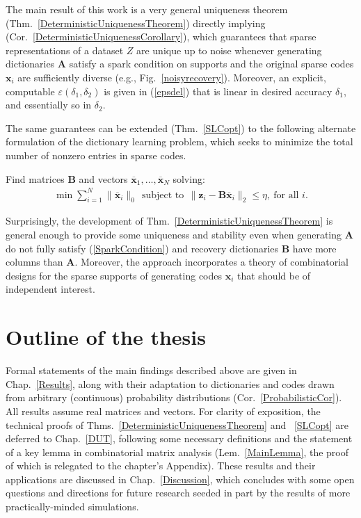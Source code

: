 The main result of this work is a very general uniqueness theorem (Thm.~\ref{DeterministicUniquenessTheorem}) directly 
implying (Cor.~\ref{DeterministicUniquenessCorollary}), which guarantees that sparse representations of a dataset $Z$ are unique up to noise whenever generating dictionaries $\mathbf{A}$ satisfy a spark condition on supports and the original sparse codes $\mathbf{x}_i$ are sufficiently diverse (e.g., Fig.~\ref{noisyrecovery}).  Moreover, an explicit, computable $\varepsilon(\delta_1, \delta_2)$ is given in (\ref{epsdel}) that is linear in desired accuracy $\delta_1$, and essentially so in $\delta_2$.

The same guarantees can be extended (Thm.~\ref{SLCopt}) to the following alternate formulation of the dictionary learning problem, which seeks to minimize the total number of nonzero entries in sparse codes.

\begin{problem}\label{OptimizationProblem}
Find matrices $\mathbf{B}$ and vectors \mbox{$\mathbf{\overline x}_1, \ldots, \mathbf{\overline x}_N$} solving:
\begin{align}\label{minsum}
\min \sum_{i = 1}^N \|\mathbf{\overline x}_{i}\|_0 \ \
\text{subject to} \ \ \|\mathbf{z}_i - \mathbf{B}\mathbf{\overline x}_i\|_2 \leq \eta, \ \text{for all $i$}.
\end{align}
\end{problem}

Surprisingly, the development of Thm.~\ref{DeterministicUniquenessTheorem} is general enough to provide some uniqueness and stability even when generating $\mathbf{A}$ do not fully satisfy (\ref{SparkCondition}) and recovery dictionaries $\mathbf{B}$ have more columns than $\mathbf{A}$.  Moreover, the approach incorporates a theory of combinatorial designs for the sparse supports of generating codes $\mathbf{x}_i$ that should be of independent interest. 

\section{Outline of the thesis}

Formal statements of the main findings described above are given in Chap.~\ref{Results}, along with their adaptation to dictionaries and codes drawn from arbitrary (continuous) probability distributions (Cor.~\ref{ProbabilisticCor}). All results assume real matrices and vectors. For clarity of exposition, the technical proofs of Thms.~\ref{DeterministicUniquenessTheorem} and ~\ref{SLCopt} are deferred to Chap.~\ref{DUT}, following some necessary definitions and the statement of a key lemma in combinatorial matrix analysis (Lem.~\ref{MainLemma}, the proof of which is relegated to the chapter's Appendix). These results and their applications are discussed in Chap.~\ref{Discussion}, which concludes with some open questions and directions for future research seeded in part by the results of more practically-minded simulations. 
